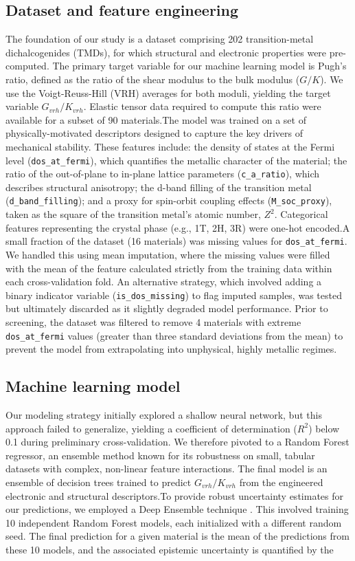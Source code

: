 \documentclass[]{article}
\begin{document}
\subsection{Dataset and feature engineering}The foundation of our study is a dataset comprising 202 transition-metal dichalcogenides (TMDs), for which structural and electronic properties were pre-computed. The primary target variable for our machine learning model is Pugh's ratio, defined as the ratio of the shear modulus to the bulk modulus ($G/K$). We use the Voigt-Reuss-Hill (VRH) averages for both moduli, yielding the target variable $G_{vrh}/K_{vrh}$. Elastic tensor data required to compute this ratio were available for a subset of 90 materials.The model was trained on a set of physically-motivated descriptors designed to capture the key drivers of mechanical stability. These features include: the density of states at the Fermi level (\texttt{dos\_at\_fermi}), which quantifies the metallic character of the material; the ratio of the out-of-plane to in-plane lattice parameters (\texttt{c\_a\_ratio}), which describes structural anisotropy; the d-band filling of the transition metal (\texttt{d\_band\_filling}); and a proxy for spin-orbit coupling effects (\texttt{M\_soc\_proxy}), taken as the square of the transition metal's atomic number, $Z^2$. Categorical features representing the crystal phase (e.g., 1T, 2H, 3R) were one-hot encoded.A small fraction of the dataset (16 materials) was missing values for \texttt{dos\_at\_fermi}. We handled this using mean imputation, where the missing values were filled with the mean of the feature calculated strictly from the training data within each cross-validation fold. An alternative strategy, which involved adding a binary indicator variable (\texttt{is\_dos\_missing}) to flag imputed samples, was tested but ultimately discarded as it slightly degraded model performance. Prior to screening, the dataset was filtered to remove 4 materials with extreme \texttt{dos\_at\_fermi} values (greater than three standard deviations from the mean) to prevent the model from extrapolating into unphysical, highly metallic regimes.\subsection{Machine learning model}Our modeling strategy initially explored a shallow neural network, but this approach failed to generalize, yielding a coefficient of determination ($R^2$) below 0.1 during preliminary cross-validation. We therefore pivoted to a Random Forest regressor, an ensemble method known for its robustness on small, tabular datasets with complex, non-linear feature interactions. The final model is an ensemble of decision trees trained to predict $G_{vrh}/K_{vrh}$ from the engineered electronic and structural descriptors.To provide robust uncertainty estimates for our predictions, we employed a Deep Ensemble technique \citep{lakshminarayanan2017simplescalablepredictiveuncertainty}. This involved training 10 independent Random Forest models, each initialized with a different random seed. The final prediction for a given material is the mean of the predictions from these 10 models, and the associated epistemic uncertainty is quantified by the 
\end{document}
